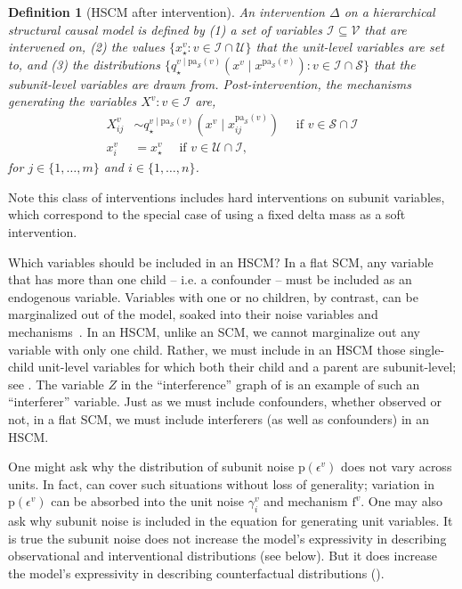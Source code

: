 \documentclass[12pt]{article}
\newtheorem{definition}{Definition}
\newcommand{\pa}{\mathrm{pa}}
\newcommand{\pr}{\mathrm{p}}
\newcommand{\f}{\mathrm{f}}
\begin{document}
\begin{definition}[HSCM after intervention] \label{def:intervention} An
  intervention $\Delta$ on a hierarchical structural causal model is
  defined by (1) a set of variables
  $\mathcal{I} \subseteq \mathcal{V}$ that are intervened on, (2) the
  values $\{x_\star^{v}: v \in \mathcal{I} \cap \mathcal{U}\}$ that the
  unit-level variables are set to, and (3) the distributions
  $\{q^{v \mid \pa_\mathcal{S}(v)}_\star(x^v \mid x^{\pa_\mathcal{S}(v)}): v \in \mathcal{I} \cap \mathcal{S}\}$ that the subunit-level
  variables are drawn from.  
Post-intervention, the mechanisms generating the variables $X^v: v \in \mathcal{I}$ are,
  \begin{equation}
  \begin{split}	
    X^v_{ij} &\sim  q^{v \mid \pa_\mathcal{S}(v)}_\star(x^v \mid x^{\pa_\mathcal{S}(v)}_{ij}) \quad \text{ if } v \in  \mathcal{S} \cap \mathcal{I} \\
    x^v_i & = x_\star^v \quad \text{ if } v \in \mathcal{U} \cap \mathcal{I},
  \end{split}
  \end{equation}
  for $j \in \{1, \ldots, m\}$ and $i \in \{1, \ldots, n\}$.
\end{definition}
\noindent Note this class of interventions includes hard interventions on subunit variables, which correspond to the special case of using a fixed delta mass as a soft intervention.

Which variables should be included in an HSCM? In a flat SCM, any variable that has more than one child -- i.e. a confounder -- must be included as an endogenous variable. Variables with one or no children, by contrast, can be marginalized out of the model, soaked into their noise variables and mechanisms~\citep[see e.g.][Def. 5,6]{Spirtes2010-cu,Richardson2002-sp,Janzing2022-rn}. 
In an HSCM, unlike an SCM, we cannot marginalize out any variable with only one child. Rather, we must include in an HSCM those single-child unit-level variables for which both their child and a parent are subunit-level; see .
The variable $Z$ in the ``interference'' graph of  is an example of such an ``interferer'' variable. Just as we must include confounders, whether observed or not, in a flat SCM, we must include interferers (as well as confounders) in an HSCM.

One might ask why the distribution of subunit noise $\pr(\epsilon^v)$ does not vary across units.  In fact,  can cover such situations without loss of generality; variation in $\pr(\epsilon^v)$ can be absorbed into the unit noise $\gamma_i^v$ and mechanism $\f^v$. One may also ask why subunit noise is included in the equation for generating unit variables. It is true the subunit noise does not increase the model's expressivity in describing observational and interventional distributions (see  below). But it does increase the model's expressivity in describing counterfactual distributions ().
\end{document}
